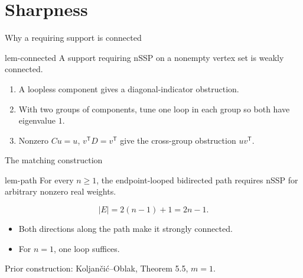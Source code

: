 \documentclass{beamer}
\begin{document}
\section{Sharpness}
\begin{frame}{Why a requiring support is connected}
\begin{bookresult}{lem-connected}
A support requiring nSSP on a nonempty vertex set is weakly connected.
\end{bookresult}
\begin{enumerate}
\item A loopless component gives a diagonal-indicator obstruction.
\item With two groups of components, tune one loop in each group so both have eigenvalue $1$.
\item Nonzero $Cu=u$, $v^{\mathsf T}D=v^{\mathsf T}$ give the cross-group obstruction $uv^{\mathsf T}$.
\end{enumerate}
\end{frame}
\begin{frame}{The matching construction}
\begin{bookresult}{lem-path}
For every $n\geq1$, the endpoint-looped bidirected path requires nSSP for arbitrary nonzero real weights.
\end{bookresult}
\[
 |E|=2(n-1)+1=2n-1.
\]
\begin{itemize}
\item Both directions along the path make it strongly connected.
\item For $n=1$, one loop suffices.
\end{itemize}
\small Prior construction: Koljančić--Oblak, Theorem 5.5, $m=1$.
\end{frame}
\end{document}
